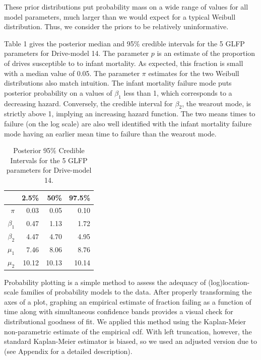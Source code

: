 \documentclass[12pt]{article}
\begin{document}
These prior distributions put probability mass on a wide range of values for all model parameters, much larger than we would expect for a typical Weibull distribution.  Thus, we consider the priors to be relatively uninformative. 


Table 1 gives the posterior median and 95\% credible intervals for the 5 GLFP parameters for Drive-model 14.  The parameter $p$ is an estimate of the proportion of drives susceptible to to infant mortality.  As expected, this fraction is small with a median value of 0.05.  The parameter $\pi$ estimates for the two Weibull distributions also match intuition.  The infant mortality failure mode puts posterior probability on a values of $\beta_1$ less than 1, which corresponds to a decreasing hazard.  Conversely, the credible interval for $\beta_2$, the wearout mode, is strictly above 1, implying an increasing hazard function.  The two means times to failure (on the log scale) are also well identified with the infant mortality failure mode having an earlier mean time to failure than the wearout mode. 

\begin{table}[H]
\centering
\begin{tabular}{rrrr}
  \hline
 & 2.5\% & 50\% & 97.5\% \\ 
  \hline
$\pi$ & 0.03 & 0.05 & 0.10 \\ 
 $\beta_1$ & 0.47 & 1.13 & 1.72 \\ 
  $\beta_2$ & 4.47 & 4.70 & 4.95 \\ 
  $\mu_1$ & 7.46 & 8.06 & 8.76 \\ 
  $\mu_2$ & 10.12 & 10.13 & 10.14 \\ 
   \hline
\end{tabular}
\caption{Posterior 95\% Credible Intervals for the 5 GLFP parameters for Drive-model 14.}
\label{table:1}
\end{table}

Probability plotting is a simple method to assess the adequacy of (log)location-scale families of probability models to the data.  After properly transforming the axes of a plot, graphing an empirical estimate of fraction failing as a function of time along with simultaneous confidence bands provides a visual check for distributional goodness of fit.  We applied this method using the Kaplan-Meier non-parametric estimate of the empirical cdf.  With left truncation, however, the standard Kaplan-Meier estimator is biased, so we used an adjusted version due to \cite[Chapter 11]{meeker} (see Appendix for a detailed description).   
\end{document}
